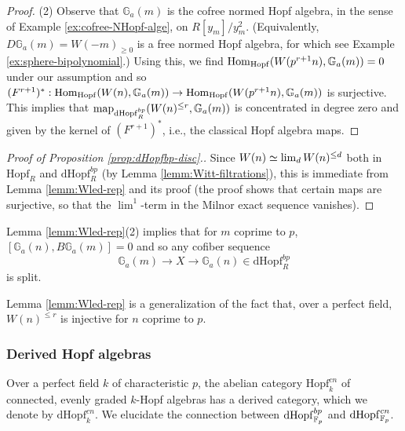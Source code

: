 \documentclass{amsart}
\numberwithin{proposition}{section}
\numberwithin{equation}{section}
\def\Hopf{\mathrm{Hopf}}
\def\dHopf{\mathrm{dHopf}}
\def\Hopf{\mathrm{Hopf}}
\def\DAlg{\mathrm{DAlg}}
\newcommand{\Ga}{{\mathbb{G}_a}}
\begin{document}
\begin{proof}

(2)
Observe that $\Ga(m)$ is the cofree normed Hopf algebra, in the sense of Example \ref{ex:cofree-NHopf-alge}, on $R[y_m]/y_m^2$.
(Equivalently, $D\Ga(m) = W(-m)_{\ge 0}$ is a free normed Hopf algebra, for which see Example \ref{ex:sphere-bipolynomial}.)
Using this, we find $\Hom_{\Hopf}(W(p^{r+1}n), \Ga(m)) = 0$ under our assumption and so $(F^{r+1})^*: \Hom_{\Hopf}(W(n), \Ga(m)) \to \Hom_{\Hopf}(W(p^{r+1}n), \Ga(m))$ is surjective.
This implies that $\map_{\dHopf_R^{bp}}(W(n)^{\le r}, \Ga(m))$ is concentrated in degree zero and given by the kernel of $(F^{r+1})^*$, i.e., the classical Hopf algebra maps.
\end{proof}

\begin{proof}[Proof of Proposition \ref{prop:dHopfbp-disc}.]
Since $W(n) \simeq \operatorname*{lim}_d W(n)^{\le d}$ both in $\Hopf_R$ and $\dHopf_R^{bp}$ (by Lemma \ref{lemm:Witt-filtrations}), this is immediate from Lemma \ref{lemm:Wled-rep} and its proof (the proof shows that certain maps are surjective, so that the $\lim^1$-term in the Milnor exact sequence vanishes).
\end{proof}

\begin{example} \label{ex:Ga-injective}
Lemma \ref{lemm:Wled-rep}(2) implies that for $m$ coprime to $p$, $[\Ga(n), B\Ga(m)] = 0$ and so any cofiber sequence \[ \Ga(m) \to X \to \Ga(n) \in \dHopf_R^{bp} \] is split.
\end{example}

\begin{remark}
Lemma \ref{lemm:Wled-rep} is a generalization of the fact that, over a perfect field, $W(n)^{\le r}$ is injective for $n$ coprime to $p$.
\end{remark}

\subsubsection{Derived Hopf algebras} \label{subsec:derived-hopf-alg}
Over a perfect field $k$ of characteristic $p$, the abelian category $\Hopf_k^{cn}$ of connected, evenly graded $k$-Hopf algebras has a derived category, which we denote by $\dHopf_k^{cn}$.
We elucidate the connection between $\dHopf_{\F_p}^{bp}$ and $\dHopf_{\F_p}^{cn}$.
\end{document}
